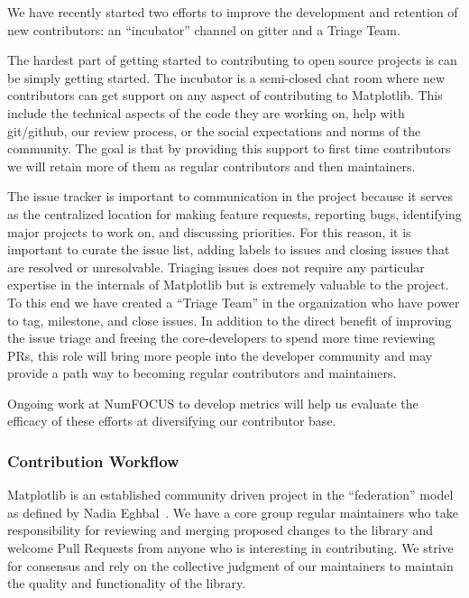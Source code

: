 \documentclass[12pt]{article}
\numberwithin{page}{section}
\begin{document}
We have recently started two efforts to improve the development and
retention of new contributors: an ``incubator'' channel on gitter and
a Triage Team.

The hardest part of getting started to contributing to open source
projects is can be simply getting started.  The incubator is a
semi-closed chat room where new contributors can get support on any
aspect of contributing to Matplotlib.  This include the technical
aspects of the code they are working on, help with git/github, our
review process, or the social expectations and norms of the community.  The
goal is that by providing this support to first time contributors we will
retain more of them as regular contributors and then maintainers.

The issue tracker is important to communication in the project because
it serves as the centralized location for making feature requests,
reporting bugs, identifying major projects to work on, and discussing
priorities.  For this reason, it is important to curate the issue
list, adding labels to issues and closing issues that are resolved or
unresolvable. Triaging issues does not require any particular
expertise in the internals of Matplotlib but is extremely valuable to
the project.  To this end we have created a ``Triage Team'' in the
organization who have power to tag, milestone, and close issues.  In
addition to the direct benefit of improving the issue triage and
freeing the core-developers to spend more time reviewing PRs, this
role will bring more people into the developer community and may
provide a path way to becoming regular contributors and maintainers.

Ongoing work at NumFOCUS to develop metrics will help us evaluate the
efficacy of these efforts at diversifying our contributor base.

\subsubsection{Contribution Workflow}


Matplotlib is an established community driven project in the
``federation'' model as defined by Nadia Eghbal~\cite{eghbal_2020}.
We have a core group regular maintainers who take responsibility for
reviewing and merging proposed changes to the library and  welcome Pull
Requests from anyone who is interesting in contributing.  We strive
for consensus and rely on the collective judgment of our maintainers
to maintain the quality and functionality of the library.
\end{document}
